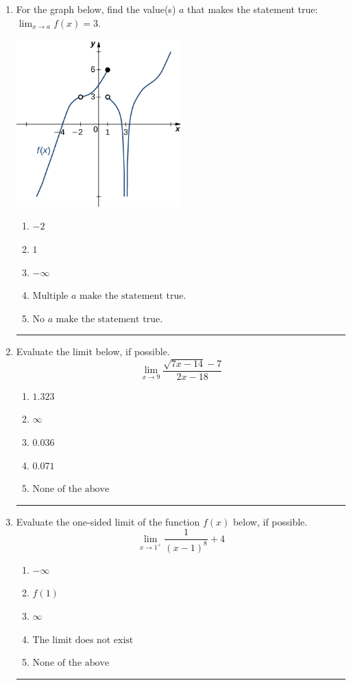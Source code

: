 \documentclass[14pt]{extbook}
\newcommand{\litem}[1]{\item#1\hspace*{-1cm}\rule{\textwidth}{0.4pt}}
\begin{document}
\begin{enumerate}
\litem{
For the graph below, find the value(s) $a$ that makes the statement true: $ \displaystyle \lim_{x \rightarrow a} f(x) = 3$.
\begin{center}
    \includegraphics[width=0.5\textwidth]{../Figures/evaluateLimitGraphicallyC.png}
\end{center}
\begin{enumerate}[label=\Alph*.]
\item \( -2 \)
\item \( 1 \)
\item \( -\infty \)
\item \( \text{Multiple } a \text{ make the statement true}. \)
\item \( \text{No } a \text{ make the statement true}. \)

\end{enumerate} }
\litem{
Evaluate the limit below, if possible.\[ \lim_{x \rightarrow 9} \frac{\sqrt{7x - 14} - 7}{2x - 18} \]\begin{enumerate}[label=\Alph*.]
\item \( 1.323 \)
\item \( \infty \)
\item \( 0.036 \)
\item \( 0.071 \)
\item \( \text{None of the above} \)

\end{enumerate} }
\litem{
Evaluate the one-sided limit of the function $f(x)$ below, if possible.\[ \lim_{x \rightarrow 1^+} \frac{1}{(x-1)^8}+4 \]\begin{enumerate}[label=\Alph*.]
\item \( -\infty \)
\item \( f(1) \)
\item \( \infty \)
\item \( \text{The limit does not exist} \)
\item \( \text{None of the above} \)


\end{enumerate}}
\end{enumerate}
\end{document}
